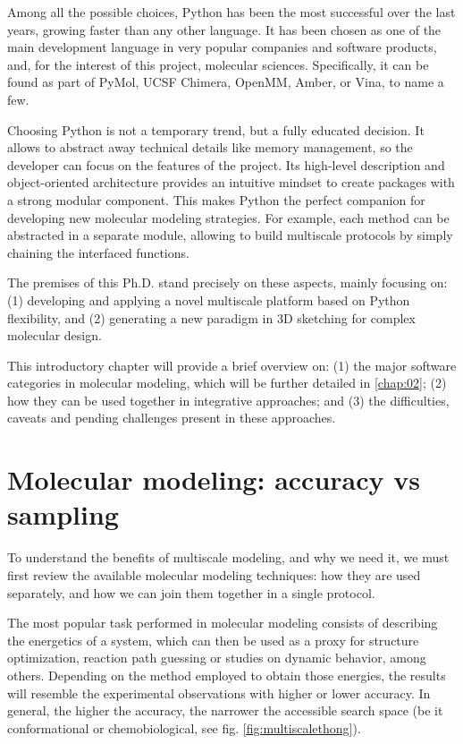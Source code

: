 Among all the possible choices, Python has been the most successful over the last years, growing faster than any other language.\cite{stackoverflowpythongrowth} It has been chosen as one of the main development language in very popular companies and software products,\cite{pythonsuccess,googlepython,facebookpython,netflixpython} and, for the interest of this project, molecular sciences. Specifically, it can be found as part of PyMol,\cite{delano2002pymol} UCSF Chimera,\cite{chimera} OpenMM,\cite{openmm} Amber,\cite{amber} or Vina,\cite{trott2010autodock} to name a few.

Choosing Python is not a temporary trend, but a fully educated decision. It allows to abstract away technical details like memory management, so the developer can focus on the features of the project. Its high-level description and object-oriented architecture provides an intuitive mindset to create packages with a strong modular component. This makes Python the perfect companion for developing new molecular modeling strategies. For example, each method can be abstracted in a separate module, allowing to build multiscale protocols by simply chaining the interfaced functions.

The premises of this Ph.D. stand precisely on these aspects, mainly focusing on: (1) developing and applying a novel multiscale platform based on Python flexibility, and (2) generating a new paradigm in 3D sketching for complex molecular design.

This introductory chapter will provide a brief overview on: (1) the major software categories in molecular modeling, which will be further detailed in \autoref{chap:02}; (2) how they can be used together in integrative approaches; and (3) the difficulties, caveats and pending challenges present in these approaches.

\section{Molecular modeling: accuracy vs sampling}

To understand the benefits of multiscale modeling, and why we need it, we must first review the available molecular modeling techniques: how they are used separately, and how we can join them together in a single protocol.

The most popular task performed in molecular modeling consists of describing the energetics of a system, which can then be used as a proxy for structure optimization, reaction path guessing or studies on dynamic behavior, among others. Depending on the method employed to obtain those energies, the results will resemble the experimental observations with higher or lower accuracy. In general, the higher the accuracy, the narrower the accessible search space (be it conformational or chemobiological, see fig. \ref{fig:multiscalethong}).

